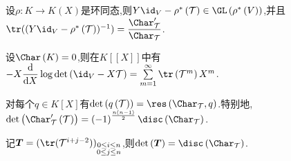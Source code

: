 \begin{proposition}{}{}
	设$\rho:K\to K(X)$是环同态,则$Y\id_{V}-\rho^{\ast}\left(\mathcal{T}\right)\in\GL\left(\rho^{\ast}\left(V\right)\right)$,并且$\tr((Y\id_{V}-\rho^{\ast}\left(\mathcal{T}\right))^{-1})=\dfrac{\Char_{\mathcal{T}}^{\prime}}{\Char_{\mathcal{T}}}$.
\end{proposition}

\begin{corollary}{}{}
	设$\Char\left(K\right)=0$,则在$K[[X]]$中有$-X\dfrac{\mathrm{d}}{\mathrm{d}X}\log\det\left(\id_{V}-X\mathcal{T}\right)=\sum\limits_{m=1}^{\infty}\tr\left(\mathcal{T}^{m}\right)X^{m}$.
\end{corollary}

\begin{remark}{}{}
	对每个$q\in K[X]$有$\det\left(q\left(\mathcal{T}\right)\right)=\res\left(\Char_{\mathcal{T}},q\right)$.特别地,$\det\left(\Char_{\mathcal{T}}^{\prime}\left(\mathcal{T}\right)\right)=\left(-1\right)^{\frac{n\left(n-1\right)}{2}}\disc\left(\Char_{\mathcal{T}}\right)$.
\end{remark}

\begin{corollary}{}{}
	记$\boldsymbol{T}=(\tr(\mathcal{T}^{i+j-2}))_{\substack{0\leq i\leq n\\ 0\leq j\leq n}}$,则$\det\left(\boldsymbol{T}\right)=\disc\left(\Char_{\mathcal{T}}\right)$.
\end{corollary}




